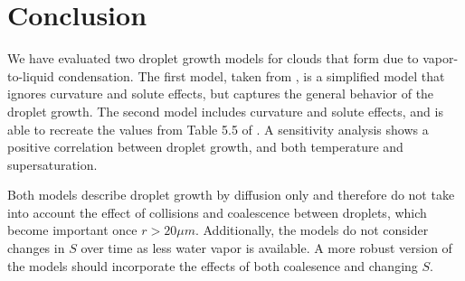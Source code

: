 \documentclass[titlepage]{article}
\begin{document}
\section{Conclusion}
We have evaluated two droplet growth models for clouds that form due to
vapor-to-liquid condensation. The first model, taken from \cite{Curry}, is a
simplified model that ignores curvature and solute effects, but captures the
general behavior of the droplet growth. The second model includes curvature and
solute effects, and is able to recreate the values from Table 5.5 of
\cite{Curry}. A sensitivity analysis shows a positive correlation between droplet
growth, and both temperature and supersaturation.

Both models describe droplet growth by diffusion only and therefore do not take into
account the effect of collisions and coalescence between droplets, which become
important once $r > 20 \mu m$. Additionally, the models do not consider changes
in $S$ over time as less water vapor is available. A more robust version of the
models should incorporate the effects of both coalesence and changing $S$.




\end{document}

